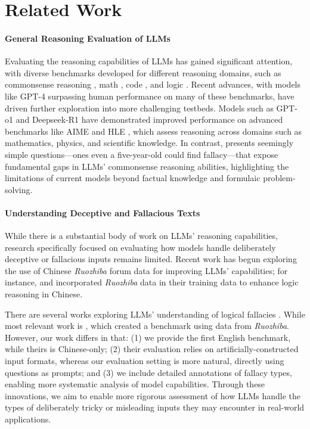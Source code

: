 \section{Related Work}
\label{sec:related_work}

\paragraph{General Reasoning Evaluation of LLMs}
Evaluating the reasoning capabilities of LLMs has gained significant attention, with diverse benchmarks developed for different reasoning domains, such as commonsense reasoning \cite{commonsenseqa,hellaswag,arc,Bisk2020}, math \cite{gsm8k,math}, code \cite{humaneval, mbpp}, and logic \cite{liu2020logiqachallengedatasetmachine,logiqa2,liu2023evaluatinglogicalreasoningability}. 
Recent advances, with models like GPT-4 surpassing human performance on many of these benchmarks, have driven further exploration into more challenging testbeds. Models such as GPT-o1 \cite{openai2024openaio1card} and Deepseek-R1 \cite{deepseekai2025deepseekr1incentivizingreasoningcapability} have demonstrated improved performance on advanced benchmarks like AIME \cite{aime} and HLE \cite{phan2025humanitysexam}, which assess reasoning across domains such as mathematics, physics, and scientific knowledge. In contrast, \data presents seemingly simple questions---ones even a five-year-old could find fallacy---that expose fundamental gaps in LLMs’ commonsense reasoning abilities, highlighting the limitations of current models beyond factual knowledge and formulaic problem-solving.


\paragraph{Understanding Deceptive and Fallacious Texts}
While there is a substantial body of work on LLMs' reasoning capabilities, research specifically focused on evaluating how models handle deliberately deceptive or fallacious inputs remains limited. Recent work has begun exploring the use of Chinese \textit{Ruozhiba} forum data for improving LLMs' capabilities; for instance, \citet{lin2024baichuanalignmenttechnicalreport} and \citet{bai2024coigcqia} incorporated \textit{Ruozhiba} data in their training data to enhance logic reasoning in Chinese. 

There are several works exploring LLMs' understanding of logical fallacies \cite{lei-huang-2024-boosting,payandeh2023susceptiblellmslogicalfallacies,li2024reasonfallacyenhancinglarge}. While most relevant work is \citet{li2024when}, which created a benchmark using data from \textit{Ruozhiba}. However, our work differs in that: (1) we provide the first English benchmark, while theirs is Chinese-only; (2) their evaluation relies on artificially-constructed input formats, whereas our evaluation setting is more natural, directly using questions as prompts; and (3) we include detailed annotations of fallacy types, enabling more systematic analysis of model capabilities.
Through these innovations, we aim to enable more rigorous assessment of how LLMs handle the types of deliberately tricky or misleading inputs they may encounter in real-world applications.